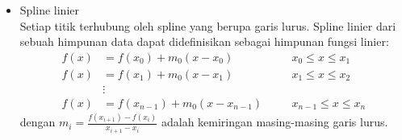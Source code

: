 \documentclass{article}
\begin{document}
\begin{enumerate}
    \begin{itemize}
        \item Spline linier \\
        Setiap titik terhubung oleh spline yang berupa garis lurus. Spline linier dari sebuah himpunan data dapat didefinisikan sebagai himpunan fungsi linier:
        \begin{align*}
            f(x) &= f(x_0) + m_0(x - x_0) \quad && x_0 \leq x \leq x_1 \\
            f(x) &= f(x_1) + m_0(x - x_1) \quad && x_1 \leq x \leq x_2 \\
            &\vdots && \\
            f(x) &= f(x_{n-1}) + m_0(x - x_{n-1}) \quad && x_{n-1} \leq x \leq x_n
        \end{align*}
        dengan $m_i = \frac{f(x_{i+1}) - f(x_i)}{x_{i+1} - x_i}$ adalah kemiringan masing-masing garis lurus.


\end{itemize}
\end{enumerate}
\end{document}
